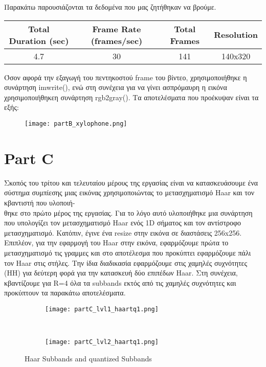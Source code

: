 \documentclass{article}
\begin{document}
	\noindent
	Παρακάτω παρουσιάζονται τα δεδομένα που μας ζητήθηκαν να βρούμε.
	
	\begin{table}[h!]
		\centering
		\begin{tabular}{|c|c|c|c|}
			\hline
		Total Duration (sec) & Frame Rate (frames/sec) & Total Frames & Resolution \\
			\hline
			4.7 & 30 & 141 & 140x320 \\
			\hline
		\end{tabular}
	\end{table}

	\noindent
	Όσον αφορά την εξαγωγή του πεντηκοστού frame του βίντεο, χρησιμοποιήθηκε η συνάρτηση imwrite(), ενώ στη συνέχεια για να γίνει ασπρόμαυρη η εικόνα χρησιμοποιήθηκεη συνάρτηση rgb2gray(). Tα αποτελέσματα που προέκυψαν είναι τα εξής:
	
	\begin{figure}[h!]
		\centering
		\texttt{[image: partB\_xylophone.png]}
	\end{figure}
\pagebreak
\section*{Part C}
	Σκοπός του τρίτου και τελευταίου μέρους της εργασίας είναι να κατασκευάσουμε ένα σύστημα συμπίεσης μιας εικόνας χρησιμοποιώντας το μετασχηματισμό Haar και τον κβαντιστή που υλοποιή- \\θηκε στο πρώτο μέρος της εργασίας. Για το λόγο αυτό υλοποιήθηκε μια συνάρτηση που υπολογίζει τον μετασχηματισμό Haar ενός 1D σήματος και τον αντίστροφο μετασχηματισμό. Kατόπιν, έγινε ένα resize στην εικόνα σε διαστάσεις 256x256. Επιπλέον, για την εφαρμογή του Haar στην εικόνα, εφαρμόζουμε πρώτα το μετασχηματισμό τις γραμμες και στο αποτέλεσμα που προκύπτει εφαρμόζουμε πάλι τον Haar στις στήλες. Tην ίδια διαδικασία εφαρμόζουμε στις χαμηλές συχνότητες (HH) για δεύτερη φορά για την κατασκευή δύο επιπέδων Haar. Στη συνέχεια, κβαντίζουμε για R=4 όλα τα subbands εκτός από τις χαμηλές συχνότητες και προκύπτουν τα παρακάτω αποτελέσματα.
	
	\begin{figure}[h!]
		\centering
		\begin{subfigure}[t]{0.5\textwidth}
			\centering
			\texttt{[image: partC\_lvl1\_haartq1.png]}
		\end{subfigure}%
		~
		\begin{subfigure}[t]{0.5\textwidth}
			\centering
			\texttt{[image: partC\_lvl2\_haartq1.png]}
		\end{subfigure}
		\caption{Haar Subbands and quantized Subbands}
	\end{figure}
\end{document}
